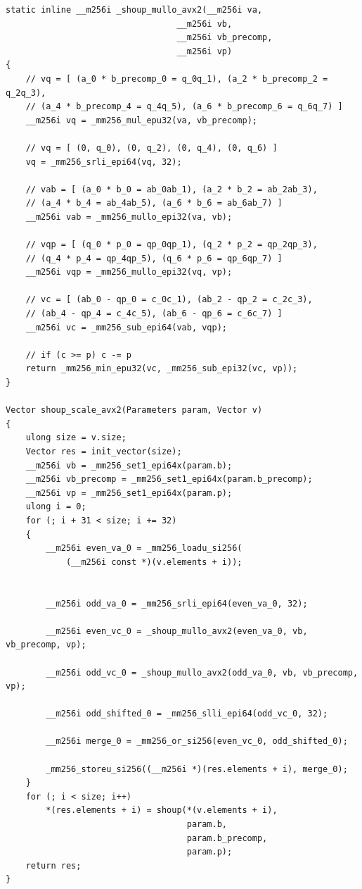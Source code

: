 \documentclass{article}
\begin{document}
\begin{lstlisting}[caption = Variant 2 (AVX2)]
static inline __m256i _shoup_mullo_avx2(__m256i va,
                                  __m256i vb,
                                  __m256i vb_precomp,
                                  __m256i vp)
{
    // vq = [ (a_0 * b_precomp_0 = q_0q_1), (a_2 * b_precomp_2 = q_2q_3),
    // (a_4 * b_precomp_4 = q_4q_5), (a_6 * b_precomp_6 = q_6q_7) ]
    __m256i vq = _mm256_mul_epu32(va, vb_precomp);

    // vq = [ (0, q_0), (0, q_2), (0, q_4), (0, q_6) ]
    vq = _mm256_srli_epi64(vq, 32);

    // vab = [ (a_0 * b_0 = ab_0ab_1), (a_2 * b_2 = ab_2ab_3),
    // (a_4 * b_4 = ab_4ab_5), (a_6 * b_6 = ab_6ab_7) ]
    __m256i vab = _mm256_mullo_epi32(va, vb);

    // vqp = [ (q_0 * p_0 = qp_0qp_1), (q_2 * p_2 = qp_2qp_3),
    // (q_4 * p_4 = qp_4qp_5), (q_6 * p_6 = qp_6qp_7) ]
    __m256i vqp = _mm256_mullo_epi32(vq, vp);

    // vc = [ (ab_0 - qp_0 = c_0c_1), (ab_2 - qp_2 = c_2c_3),
    // (ab_4 - qp_4 = c_4c_5), (ab_6 - qp_6 = c_6c_7) ]
    __m256i vc = _mm256_sub_epi64(vab, vqp);

    // if (c >= p) c -= p
    return _mm256_min_epu32(vc, _mm256_sub_epi32(vc, vp));
}

Vector shoup_scale_avx2(Parameters param, Vector v)
{
    ulong size = v.size;
    Vector res = init_vector(size);
    __m256i vb = _mm256_set1_epi64x(param.b);
    __m256i vb_precomp = _mm256_set1_epi64x(param.b_precomp);
    __m256i vp = _mm256_set1_epi64x(param.p);
    ulong i = 0;
    for (; i + 31 < size; i += 32)
    {
        __m256i even_va_0 = _mm256_loadu_si256(
            (__m256i const *)(v.elements + i));


        __m256i odd_va_0 = _mm256_srli_epi64(even_va_0, 32);

        __m256i even_vc_0 = _shoup_mullo_avx2(even_va_0, vb, vb_precomp, vp);

        __m256i odd_vc_0 = _shoup_mullo_avx2(odd_va_0, vb, vb_precomp, vp);

        __m256i odd_shifted_0 = _mm256_slli_epi64(odd_vc_0, 32);

        __m256i merge_0 = _mm256_or_si256(even_vc_0, odd_shifted_0);

        _mm256_storeu_si256((__m256i *)(res.elements + i), merge_0);
    }
    for (; i < size; i++)
        *(res.elements + i) = shoup(*(v.elements + i),
                                    param.b,
                                    param.b_precomp,
                                    param.p);
    return res;
}
\end{lstlisting}
\end{document}
